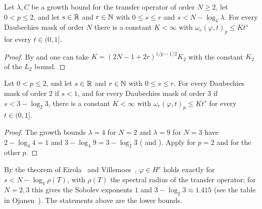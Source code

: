 \begin{theorem}
\label{thm:daub-modulus-lp}
\leanok
{}
Let $\lambda, C$ be a growth bound for the transfer operator of order $N \geq 2$, let
$0 < p \leq 2$, and let $s \in \mathbb{R}$ and $r \in \mathbb{N}$ with $0 \leq s \leq r$ and
$s < N - \log_4 \lambda$. For every Daubechies mask of order $N$ there is a constant $K < \infty$
with $\omega_r(\varphi, t)_p \leq K t^s$ for every $t \in (0, 1]$.
\end{theorem}

\begin{proof}
\leanok
{}
By  and  one can take
$K = (2N - 1 + 2r)^{1/p - 1/2} K_2$ with the constant $K_2$ of the $L_2$ bound.
\end{proof}

\begin{corollary}
\label{cor:daub-modulus-orders-two-three}
\leanok
{}
Let $0 < p \leq 2$, and let $s \in \mathbb{R}$ and $r \in \mathbb{N}$ with $0 \leq s \leq r$. For every
Daubechies mask of order $2$ if $s < 1$, and for every Daubechies mask of order $3$ if
$s < 3 - \log_2 3$, there is a constant $K < \infty$ with $\omega_r(\varphi, t)_p \leq K t^s$ for
every $t \in (0, 1]$.
\end{corollary}

\begin{proof}
\leanok
{}
The growth bounds $\lambda = 4$ for $N = 2$ and $\lambda = 9$ for $N = 3$ have
$2 - \log_4 4 = 1$ and $3 - \log_4 9 = 3 - \log_2 3$
( and ). Apply
 for $p = 2$ and  for the other $p$.
\end{proof}

By the theorem of Eirola~\cite{Eirola} and Villemoes~\cite{Villemoes}, $\varphi \in H^s$ holds
exactly for $s < N - \log_4 \rho(T)$, with $\rho(T)$ the spectral radius of the transfer
operator; for $N = 2, 3$ this gives the Sobolev exponents $1$ and $3 - \log_2 3 \approx 1.415$
(see the table in Ojanen~\cite{Ojanen}). The statements above are the lower bounds.

